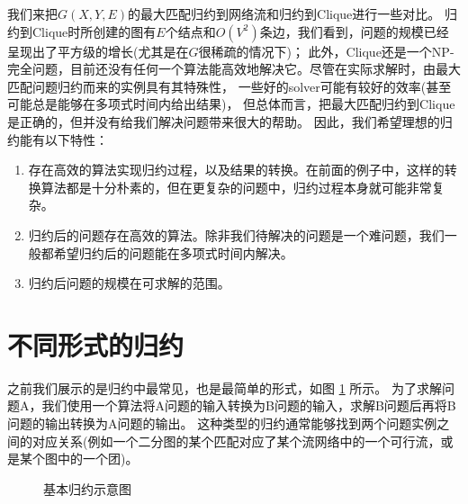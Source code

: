 我们来把$G(X,Y,E)$的最大匹配归约到网络流和归约到Clique进行一些对比。
归约到Clique时所创建的图有$E$个结点和$O(V^2)$条边，我们看到，问题的规模已经呈现出了平方级的增长(尤其是在$G$很稀疏的情况下)；
此外，Clique还是一个NP-完全问题，目前还没有任何一个算法能高效地解决它。尽管在实际求解时，由最大匹配问题归约而来的实例具有其特殊性，
一些好的solver可能有较好的效率(甚至可能总是能够在多项式时间内给出结果)，
但总体而言，把最大匹配归约到Clique是正确的，但并没有给我们解决问题带来很大的帮助。
因此，我们希望理想的归约能有以下特性：

\begin{enumerate}
 \item 存在高效的算法实现归约过程，以及结果的转换。在前面的例子中，这样的转换算法都是十分朴素的，但在更复杂的问题中，归约过程本身就可能非常复杂。
 \item 归约后的问题存在高效的算法。除非我们待解决的问题是一个难问题，我们一般都希望归约后的问题能在多项式时间内解决。
 \item 归约后问题的规模在可求解的范围。
\end{enumerate}

\section{不同形式的归约}

之前我们展示的是归约中最常见，也是最简单的形式，如图 \ref{fig:reduction-show} 所示。
为了求解问题A，我们使用一个算法将A问题的输入转换为B问题的输入，求解B问题后再将B问题的输出转换为A问题的输出。
这种类型的归约通常能够找到两个问题实例之间的对应关系(例如一个二分图的某个匹配对应了某个流网络中的一个可行流，或是某个图中的一个团)。

\begin{figure}[h]
 \center
 \caption{基本归约示意图}
 \label{fig:reduction-show}
\end{figure}

